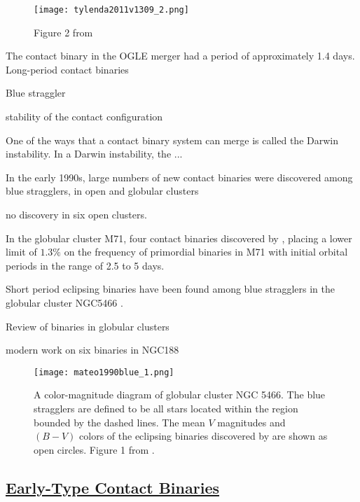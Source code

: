 \documentclass[12pt]{article} %
\numberwithin{equation}{section} %
\begin{document}
\begin{figure}[H]
\centering
\texttt{[image: tylenda2011v1309\_2.png]}
\caption{Figure 2 from \citet{tylenda2011v1309}}
\label{fig: tylenda2011v1309_2}
\end{figure}


The contact binary in the OGLE merger had a period of approximately 1.4 days. Long-period contact binaries \citep{rucinski1998eclipsing} 

Blue straggler \citet{andronov2006mergers}

stability of the contact configuration \citep{rasio1995minimum}

One of the ways that a contact binary system can merge is called the Darwin instability. In a Darwin instability, the ...

In the early 1990s, large numbers of new contact binaries were discovered among blue stragglers, in open and globular clusters 

\citep{kaluzny1988ccd} no discovery in six open clusters.

In the globular cluster M71, four contact binaries discovered by \citet{yan1994primordial}, placing a lower limit of $1.3\%$ on the frequency of primordial binaries in M71 with initial orbital periods in the range of 2.5 to 5 days. 

Short period eclipsing binaries have been found among blue stragglers in the globular cluster NGC5466 \citep{mateo1990blue}.

Review of binaries in globular clusters \citep{hut1990binaries}

modern work on six binaries in NGC188 \citep{chen2016physical}

\begin{figure}[H]
\centering
\texttt{[image: mateo1990blue\_1.png]}
\caption{A color-magnitude diagram of globular cluster NGC 5466. The blue stragglers are defined to be all stars located within the region bounded by the dashed lines. The mean $V$ magnitudes and $(B - V)$ colors of the eclipsing binaries discovered by \citet{mateo1990blue} are shown as open circles. Figure 1 from \citet{mateo1990blue}.}
\label{fig: mateo1990blue_1}
\end{figure}

\subsection[Early-Type Contact Binaries]{\hyperlink{to}{Early-Type Contact Binaries}}
\end{document}
